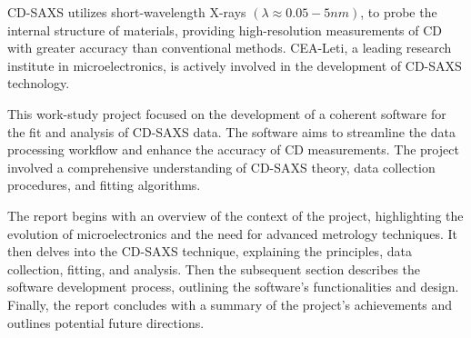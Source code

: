 \FloatBarrier

CD-SAXS utilizes short-wavelength X-rays $(\lambda \approx 0.05 - 5 nm)$, to probe the internal structure of
materials, providing high-resolution measurements of CD with greater accuracy than
conventional methods. CEA-Leti, a leading research institute in microelectronics, is actively involved in
the development of CD-SAXS technology.

\medskip

This work-study project focused on the development of a coherent software for the fit and analysis of CD-SAXS
data. The software aims to streamline the data processing workflow and enhance the accuracy of CD measurements.
The project involved a comprehensive understanding of CD-SAXS theory, data collection procedures, and fitting
algorithms.

\medskip

The report begins with an overview of the context of the project, highlighting the evolution of
microelectronics and the need for advanced metrology techniques. It then delves into the CD-SAXS technique, 
explaining the principles, data collection, fitting, and analysis. Then the subsequent
section describes the software development process, outlining the software's functionalities and design. Finally, the report concludes with a summary of the project's achievements and
outlines potential future directions.